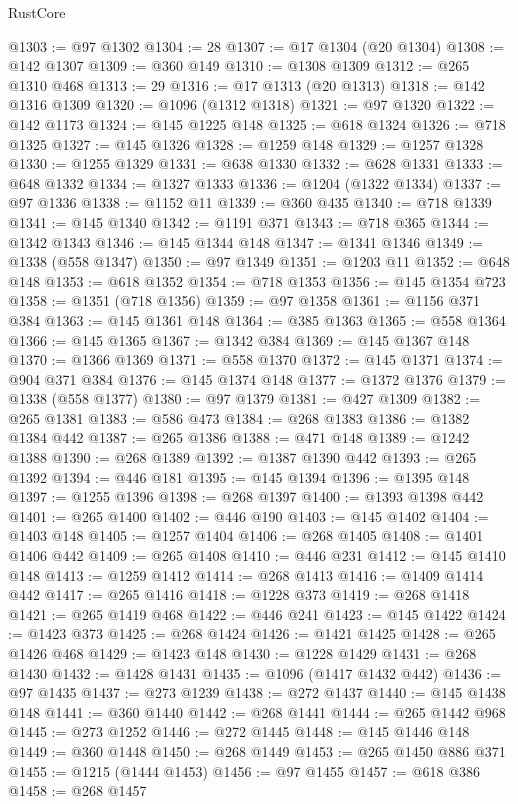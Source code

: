 \begin{lexlean}{RustCore}
\begin{coremodule}
@1303 := @97 @1302
@1304 := 28
@1307 := @17 @1304 (@20 @1304)
@1308 := @142 @1307
@1309 := @360 @149
@1310 := @1308 @1309
@1312 := @265 @1310 @468
@1313 := 29
@1316 := @17 @1313 (@20 @1313)
@1318 := @142 @1316 @1309
@1320 := @1096 (@1312 @1318)
@1321 := @97 @1320
@1322 := @142 @1173
@1324 := @145 @1225 @148
@1325 := @618 @1324
@1326 := @718 @1325
@1327 := @145 @1326
@1328 := @1259 @148
@1329 := @1257 @1328
@1330 := @1255 @1329
@1331 := @638 @1330
@1332 := @628 @1331
@1333 := @648 @1332
@1334 := @1327 @1333
@1336 := @1204 (@1322 @1334)
@1337 := @97 @1336
@1338 := @1152 @11
@1339 := @360 @435
@1340 := @718 @1339
@1341 := @145 @1340
@1342 := @1191 @371
@1343 := @718 @365
@1344 := @1342 @1343
@1346 := @145 @1344 @148
@1347 := @1341 @1346
@1349 := @1338 (@558 @1347)
@1350 := @97 @1349
@1351 := @1203 @11
@1352 := @648 @148
@1353 := @618 @1352
@1354 := @718 @1353
@1356 := @145 @1354 @723
@1358 := @1351 (@718 @1356)
@1359 := @97 @1358
@1361 := @1156 @371 @384
@1363 := @145 @1361 @148
@1364 := @385 @1363
@1365 := @558 @1364
@1366 := @145 @1365
@1367 := @1342 @384
@1369 := @145 @1367 @148
@1370 := @1366 @1369
@1371 := @558 @1370
@1372 := @145 @1371
@1374 := @904 @371 @384
@1376 := @145 @1374 @148
@1377 := @1372 @1376
@1379 := @1338 (@558 @1377)
@1380 := @97 @1379
@1381 := @427 @1309
@1382 := @265 @1381
@1383 := @586 @473
@1384 := @268 @1383
@1386 := @1382 @1384 @442
@1387 := @265 @1386
@1388 := @471 @148
@1389 := @1242 @1388
@1390 := @268 @1389
@1392 := @1387 @1390 @442
@1393 := @265 @1392
@1394 := @446 @181
@1395 := @145 @1394
@1396 := @1395 @148
@1397 := @1255 @1396
@1398 := @268 @1397
@1400 := @1393 @1398 @442
@1401 := @265 @1400
@1402 := @446 @190
@1403 := @145 @1402
@1404 := @1403 @148
@1405 := @1257 @1404
@1406 := @268 @1405
@1408 := @1401 @1406 @442
@1409 := @265 @1408
@1410 := @446 @231
@1412 := @145 @1410 @148
@1413 := @1259 @1412
@1414 := @268 @1413
@1416 := @1409 @1414 @442
@1417 := @265 @1416
@1418 := @1228 @373
@1419 := @268 @1418
@1421 := @265 @1419 @468
@1422 := @446 @241
@1423 := @145 @1422
@1424 := @1423 @373
@1425 := @268 @1424
@1426 := @1421 @1425
@1428 := @265 @1426 @468
@1429 := @1423 @148
@1430 := @1228 @1429
@1431 := @268 @1430
@1432 := @1428 @1431
@1435 := @1096 (@1417 @1432 @442)
@1436 := @97 @1435
@1437 := @273 @1239
@1438 := @272 @1437
@1440 := @145 @1438 @148
@1441 := @360 @1440
@1442 := @268 @1441
@1444 := @265 @1442 @968
@1445 := @273 @1252
@1446 := @272 @1445
@1448 := @145 @1446 @148
@1449 := @360 @1448
@1450 := @268 @1449
@1453 := @265 @1450 @886 @371
@1455 := @1215 (@1444 @1453)
@1456 := @97 @1455
@1457 := @618 @386
@1458 := @268 @1457

\end{coremodule}
\end{lexlean}
